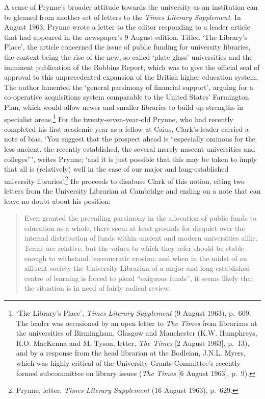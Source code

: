 \documentclass[]{article}
\begin{document}
A sense of Prynne’s broader attitude towards the university as an
institution can be gleaned from another set of letters to the
\emph{Times Literary Supplement}. In August 1963, Prynne wrote a letter
to the editor responding to a leader article that had appeared in the
newspaper’s 9 August edition. Titled ‘The Library’s Place’, the article
concerned the issue of public funding for university libraries, the
context being the rise of the new, so-called ‘plate glass’ universities
and the imminent publication of the Robbins Report, which was to give
the official seal of approval to this unprecedented expansion of the
British higher education system. The author lamented the ‘general
parsimony of financial support’, arguing for a co-operative acquisitions
system comparable to the United States’ Farmington Plan, which would
allow newer and smaller libraries to build up strengths in specialist
areas.\footnote{‘The Library’s Place’, \emph{Times Literary Supplement}
  (9 August 1963), p.~609. The leader was occasioned by an open letter
  to \emph{The Times} from librarians at the universities of Birmingham,
  Glasgow and Manchester (K.W. Humphreys, R.O. MacKenna and M. Tyson,
  letter, \emph{The Times} {[}2 August 1963{]}, p.~13), and by a
  response from the head librarian at the Bodleian, J.N.L. Myers, which
  was highly critical of the University Grants Committee’s recently
  formed subcommittee on library issues (\emph{The Times} {[}6 August
  1963{]}, p.~9).} For the twenty-seven-year-old Prynne, who had
recently completed his first academic year as a fellow at Caius, Clark’s
leader carried a note of bias. ‘You suggest that the prospect ahead is
“especially ominous for the less ancient, the recently established, the
several merely nascent universities and colleges”’, writes Prynne; ‘and
it is just possible that this may be taken to imply that all is
(relatively) well in the case of our major and long-established
university libraries’.\footnote{Prynne, letter, \emph{Times Literary
  Supplement} (16 August 1963), p.~629.} He proceeds to disabuse Clark
of this notion, citing two letters from the University Librarian at
Cambridge and ending on a note that can leave no doubt about his
position:

\begin{quote}
\singlespacing Even granted the prevailing parsimony in the allocation
of public funds to education as a whole, there seem at least grounds for
disquiet over the internal distribution of funds within ancient and
modern universities alike. Terms are relative, but the values to which
they refer should be stable enough to withstand bureaucratic erosion;
and when in the midst of an affluent society the University Librarian of
a major and long-established centre of learning is forced to plead
“exiguous funds”, it seems likely that the situation is in need of
fairly radical review.
\end{quote}
\end{document}
